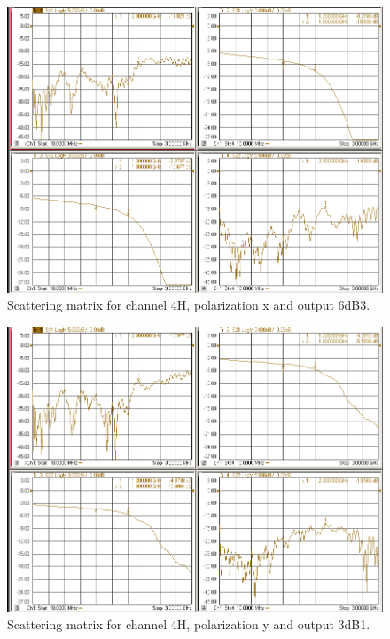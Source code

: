 \documentclass[12pt,a4paper,oneside]{article}
\begin{document}
\begin{figure}[H]
\centering
\includegraphics[width=0.9\linewidth]{VNA_results/4Hx_6dB3.png}
\caption{Scattering matrix for channel 4H, polarization x and output 6dB3.}
\label{fig:4Hx_6dB3}
\end{figure}


\begin{figure}[H]
\centering
\includegraphics[width=0.9\linewidth]{VNA_results/4Hy_3dB1.png}
\caption{Scattering matrix for channel 4H, polarization y and output 3dB1.}
\label{fig:4Hy_3dB1}
\end{figure}
\end{document}
